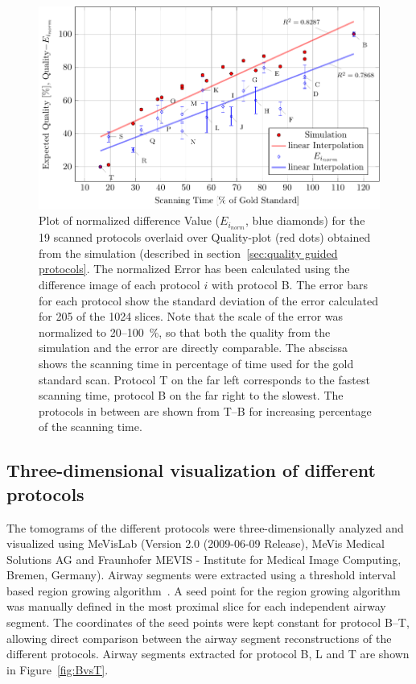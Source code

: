 \begin{figure}[htb]
	\centering
	\includegraphics[width=\linewidth]{img/Haberthuer2010/Fig06-Plot}
	\caption[Plot of normalized difference Value for the scanned protocols overlaid over Quality-plot obtained from the simulation]{Plot of normalized difference Value ($E_{i_{norm}}$, blue diamonds) for the 19 scanned protocols overlaid over Quality-plot (red dots) obtained from the simulation (described in section~\ref{sec:quality guided protocols}. The normalized Error has been calculated using the difference image of each protocol $i$ with protocol B. The error bars for each protocol show the standard deviation of the error calculated for 205 of the 1024 slices. Note that the scale of the error was normalized to 20--\SI{100}{\percent}, so that both the quality from the simulation and the error are directly comparable. The abscissa shows the scanning time in percentage of time used for the gold standard scan. Protocol T on the far left corresponds to the fastest scanning time, protocol B on the far right to the slowest. The protocols in between are shown from T--B for increasing percentage of the scanning time.}
	\label{fig:NormalizedErrorPlot}
\end{figure}

\subsection{Three-dimensional visualization of different protocols}
\label{subsec:comparison}
The tomograms of the different protocols were three-dimensionally analyzed and visualized using MeVisLab (Version 2.0 (2009-06-09 Release), MeVis Medical Solutions AG and Fraunhofer MEVIS - Institute for Medical Image Computing, Bremen, Germany). Airway segments were extracted using a threshold interval based region growing algorithm~\cite{Zucker1976}. A seed point for the region growing algorithm was manually defined in the most proximal slice for each independent airway segment. The coordinates of the seed points were kept constant for protocol B--T, allowing direct comparison between the airway segment reconstructions of the different protocols. Airway segments extracted for protocol B, L and T are shown in Figure~\ref{fig:BvsT}.

